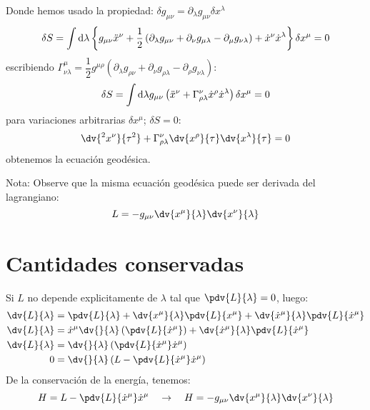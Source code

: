 \documentclass[../main]{subfiles}
\begin{document}
Donde hemos usado la propiedad: $\delta g_{\mu\nu}=\partial_{\lambda}g_{\mu\nu}\delta x^{\lambda}$
\begin{equation}
    \delta S=\int \mathrm{d}\lambda \left\{g_{\mu\nu}\ddot{x}^{\nu}+\dfrac{1}{2}\left(\partial_{\lambda}g_{\mu\nu}+\partial_{\nu}g_{\mu\lambda}-\partial_{\mu}g_{\nu\lambda}\right)+\dot{x}^{\nu}\dot{x}^{\lambda} \right\}\delta x^{\mu}=0\\
\end{equation}
escribiendo $\Gamma^{\mu}_{\nu\lambda}=\dfrac{1}{2}g^{\mu\rho}\left(\partial_{\lambda}g_{\rho\nu}+\partial_{\nu}g_{\rho\lambda}-\partial_{\rho}g_{\nu\lambda}\right)$:
\begin{equation}
    \delta S=\int \mathrm{d}\lambda g_{\mu\nu}\left(\ddot{x}^{\nu}+\Gamma^{\nu}_{\rho\lambda}\dot{x}^{\rho}\dot{x}^{\lambda}\right)\delta x^{\mu}=0\\
\end{equation}
para variaciones arbitrarias $\delta x^{\mu}$; $\delta S=0$:
\begin{equation}
    \dv{^2 x^{\nu}}{\tau^2}+\Gamma^{\nu}_{\rho\lambda}\dv{x^{\rho}}{\tau}\dv{x^{\lambda}}{\tau}=0
\end{equation}
obtenemos la ecuación geodésica.

Nota: Observe que la misma ecuación geodésica puede ser derivada del lagrangiano:
\begin{equation}
    L=-g_{\mu\nu} \dv{x^{\mu}}{\lambda} \dv{x^{\nu}}{\lambda}
    \label{ec3.14}
\end{equation}

\section{Cantidades conservadas}
Si $L$ no depende explicitamente de $\lambda$ tal que $\pdv{L}{\lambda}=0$, luego: 
\begin{equation}
    \begin{split}
        \dv{L}{\lambda}&=\pdv{L}{\lambda}+\dv{x^{\mu}}{\lambda}\pdv{L}{x^{\mu}}+\dv{\dot{x}^{\mu}}{\lambda}\pdv{L}{\dot{x}^{\mu}}\\
        \dv{L}{\lambda}&=\dot{x}^{\mu}\dv{}{\lambda}\left(\pdv{L}{\dot{x}^{\mu}}\right)+\dv{\dot{x}^{\mu}}{\lambda}\pdv{L}{\dot{x}^{\mu}}\\
        \dv{L}{\lambda}&=\dv{}{\lambda}\left(\pdv{L}{\dot{x}^{\mu}}\dot{x}^{\mu}\right)\\
        0&=\dv{}{\lambda}\left(L-\pdv{L}{\dot{x}^{\mu}}\dot{x}^{\mu}\right)
    \end{split}
\end{equation}
De la conservación de la energía, tenemos:
\begin{equation}
    H=L-\pdv{L}{\dot{x}^{\mu}}\dot{x}^{\mu} \quad \rightarrow \quad H=-g_{\mu\nu}\dv{x^{\mu}}{\lambda}\dv{x^{\nu}}{\lambda}
\end{equation}
\end{document}
